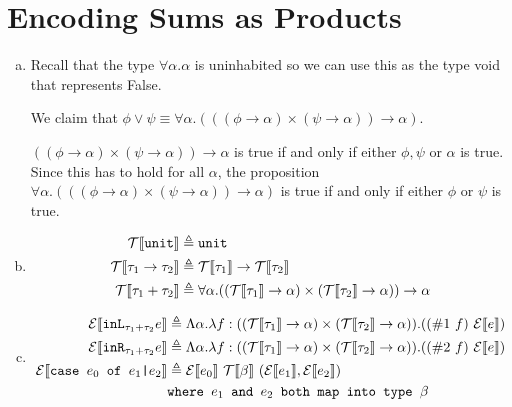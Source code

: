 \section{Encoding Sums as Products}
\begin{enumerate}[(a)]
  \item
  Recall that the type $\forall\alpha.\alpha$ is uninhabited so we can use this as the type void that represents False.

  We claim that $\phi \vee \psi \equiv \forall \alpha.(((\phi \rightarrow \alpha) \times (\psi \rightarrow \alpha)) \rightarrow \alpha)$.

  $((\phi \rightarrow \alpha) \times (\psi \rightarrow \alpha)) \rightarrow \alpha$ is true if and only if either $\phi, \psi$ or $\alpha$ is true. Since this has to hold for all $\alpha$, the proposition $\forall \alpha.(((\phi \rightarrow \alpha) \times (\psi \rightarrow \alpha)) \rightarrow \alpha)$ is true if and only if either $\phi$ or $\psi$ is true. 

   \item
   \begin{align*}
    \mathcal T \llbracket {\texttt{unit}}\rrbracket &\triangleq \texttt{unit}\\
    \mathcal T \llbracket {\tau_1 \rightarrow \tau_2}\rrbracket &\triangleq \mathcal T \llbracket {\tau_1}\rrbracket \rightarrow \mathcal T \llbracket {\tau_2}\rrbracket\\
    \mathcal T \llbracket {\tau_1 + \tau_2}\rrbracket &\triangleq \forall\alpha.((\mathcal T \llbracket {\tau_1}\rrbracket \rightarrow \alpha) \times (\mathcal T \llbracket {\tau_2}\rrbracket \rightarrow \alpha)) \rightarrow \alpha
   \end{align*}
   \item
   \begin{align*}
    \mathcal E \llbracket {\texttt{inL}_{\tau_1 + \tau_2}e}\rrbracket &\triangleq \Lambda \alpha.\lambda f : ((\mathcal T \llbracket {\tau_1}\rrbracket \rightarrow \alpha) \times (\mathcal T \llbracket {\tau_2}\rrbracket \rightarrow \alpha)). ((\#1~f)~\mathcal E \llbracket {e}\rrbracket)\\
    \mathcal E \llbracket {\texttt{inR}_{\tau_1 + \tau_2}e}\rrbracket &\triangleq \Lambda \alpha.\lambda f : ((\mathcal T \llbracket {\tau_1}\rrbracket \rightarrow \alpha) \times (\mathcal T \llbracket {\tau_2}\rrbracket \rightarrow \alpha)). ((\#2~f)~\mathcal E \llbracket {e}\rrbracket)\\
    \mathcal E \llbracket {\texttt{case $e_0$ of $e_1$|$e_2$}}\rrbracket &\triangleq \mathcal E \llbracket {e_0}\rrbracket~\mathcal T \llbracket {\beta}\rrbracket~(\mathcal E \llbracket {e_1}\rrbracket, \mathcal E \llbracket {e_2}\rrbracket) \\
    &\texttt{where $e_1$ and $e_2$ both map into type $\beta$}
   \end{align*}
\end{enumerate}